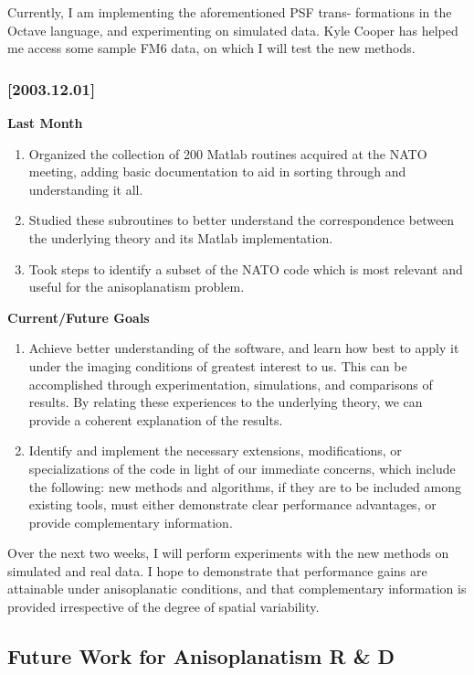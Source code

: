 Currently, I am implementing the aforementioned PSF trans-
formations in the Octave language, and experimenting on 
simulated data.  Kyle Cooper has helped me access some 
sample FM6 data, on which I will test the new methods.

\subsubsection{[2003.12.01]}
{\bf Last Month}
\begin{enumerate}
\item Organized the collection of 200 Matlab routines acquired at the NATO meeting,
   adding basic documentation to aid in sorting through and understanding it all. 
\item Studied these subroutines to better understand the correspondence between the
   underlying theory and its Matlab implementation.
\item Took steps to identify a subset of the NATO code which is most relevant and
   useful for the anisoplanatism problem.
\end{enumerate}
{\bf Current/Future Goals}
\begin{enumerate}
\item Achieve better understanding of the software, and learn how best to 
 apply it under the imaging conditions of greatest interest to us.
 This can be accomplished through experimentation, simulations, and
 comparisons of results.  By relating these experiences to the underlying
 theory, we can provide a coherent explanation of the results.  
\item Identify and implement the necessary extensions, modifications, or
specializations of the code in light of our immediate concerns, which include
the following: new methods and algorithms, if they are to be included among
existing tools, must either demonstrate clear performance advantages, or provide
complementary information.
\end{enumerate}
Over the next two weeks, I will perform experiments with the new methods on
simulated and real data.  I hope to demonstrate that performance gains are
attainable under anisoplanatic conditions, and that complementary information is
provided irrespective of the degree of spatial variability.

\subsection{Future Work for Anisoplanatism R \& D}

